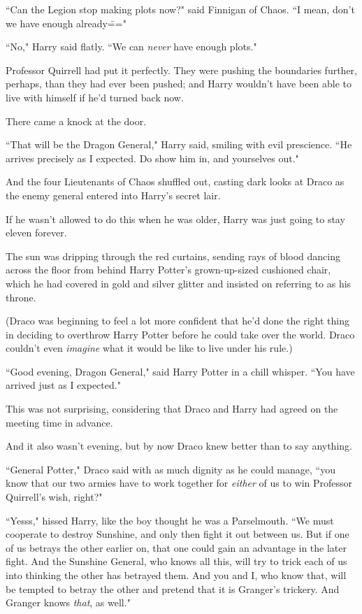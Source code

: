 ``Can the Legion stop making plots now?" said Finnigan of Chaos. ``I mean, don't we have enough already\==="

``No," Harry said flatly. ``We can \emph{never} have enough plots."

Professor Quirrell had put it perfectly. They were pushing the boundaries further, perhaps, than they had ever been pushed; and Harry wouldn't have been able to live with himself if he'd turned back now.

There came a knock at the door.

``That will be the Dragon General," Harry said, smiling with evil prescience. ``He arrives precisely as I expected. Do show him in, and yourselves out."

And the four Lieutenants of Chaos shuffled out, casting dark looks at Draco as the enemy general entered into Harry's secret lair.

If he wasn't allowed to do this when he was older, Harry was just going to stay eleven forever.

\later

The sun was dripping through the red curtains, sending rays of blood dancing across the floor from behind Harry Potter's grown-up-sized cushioned chair, which he had covered in gold and silver glitter and insisted on referring to as his throne.

(Draco was beginning to feel a lot more confident that he'd done the right thing in deciding to overthrow Harry Potter before he could take over the world. Draco couldn't even \emph{imagine} what it would be like to live under his rule.)

``Good evening, Dragon General," said Harry Potter in a chill whisper. ``You have arrived just as I expected."

This was not surprising, considering that Draco and Harry had agreed on the meeting time in advance.

And it also wasn't evening, but by now Draco knew better than to say anything.

``General Potter," Draco said with as much dignity as he could manage, ``you know that our two armies have to work together for \emph{either} of us to win Professor Quirrell's wish, right?"

``Yesss," hissed Harry, like the boy thought he was a Parselmouth. ``We must cooperate to destroy Sunshine, and only then fight it out between us. But if one of us betrays the other earlier on, that one could gain an advantage in the later fight. And the Sunshine General, who knows all this, will try to trick each of us into thinking the other has betrayed them. And you and I, who know that, will be tempted to betray the other and pretend that it is Granger's trickery. And Granger knows \emph{that}, as well."

